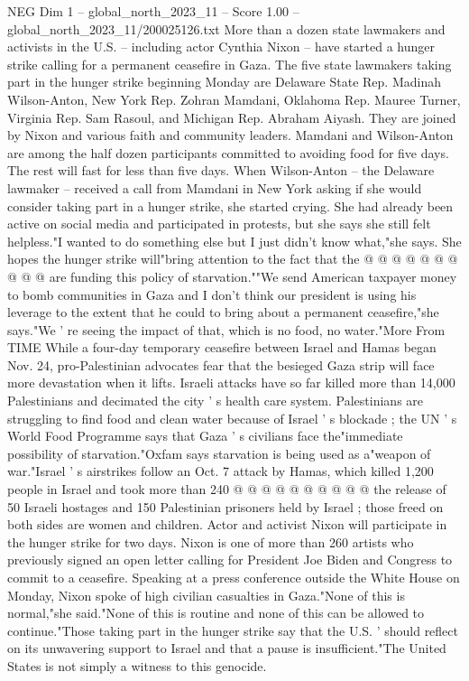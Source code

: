 \begin{textsample}{NEG Dim 1 – global\_north\_2023\_11 – Score 1.00 – global\_north\_2023\_11/200025126.txt}  \label{ex:f1_neg_103}
More than a dozen state lawmakers and activists in the U.S. -- including actor Cynthia Nixon -- have started a hunger strike calling for a permanent ceasefire in Gaza.
The five state lawmakers taking part in the hunger strike beginning Monday are Delaware State Rep.
Madinah Wilson-Anton, New York Rep.
Zohran Mamdani, Oklahoma Rep.
Mauree Turner, Virginia Rep.
Sam Rasoul, and Michigan Rep.
Abraham Aiyash.
They are joined by Nixon and various faith and community leaders.
Mamdani and Wilson-Anton are among the half dozen participants committed to avoiding food for five days.
The rest will fast for less than five days.
When Wilson-Anton -- the Delaware lawmaker -- received a call from Mamdani in New York asking if she would consider taking part in a hunger strike, she started crying.
She had already been active on social media and participated in protests, but she says she still felt helpless."I wanted to do something else but I just didn't know what,"she says.
She hopes the hunger strike will"bring attention to the fact that the @ @ @ @ @ @ @ @ @ @ are funding this policy of starvation.""We send American taxpayer money to bomb communities in Gaza and I don't think our president is using his leverage to the extent that he could to bring about a permanent ceasefire,"she says."We ' re seeing the impact of that, which is no food, no water."More From TIME While a four-day temporary ceasefire between Israel and Hamas began Nov. 24, pro-Palestinian advocates fear that the besieged Gaza strip will face more devastation when it lifts.
Israeli attacks have so far killed more than 14,000 Palestinians and decimated the city ' s health care system.
Palestinians are struggling to find food and clean water because of Israel ' s blockade ; the UN ' s World Food Programme says that Gaza ' s civilians face the"immediate possibility of starvation."Oxfam says starvation is being used as a"weapon of war."Israel ' s airstrikes follow an Oct. 7 attack by Hamas, which killed 1,200 people in Israel and took more than 240 @ @ @ @ @ @ @ @ @ @ the release of 50 Israeli hostages and 150 Palestinian prisoners held by Israel ; those freed on both sides are women and children.
Actor and activist Nixon will participate in the hunger strike for two days.
Nixon is one of more than 260 artists who previously signed an open letter calling for President Joe Biden and Congress to commit to a ceasefire.
Speaking at a press conference outside the White House on Monday, Nixon spoke of high civilian casualties in Gaza."None of this is normal,"she said."None of this is routine and none of this can be allowed to continue."Those taking part in the hunger strike say that the U.S. ' should reflect on its unwavering support to Israel and that a pause is insufficient."The United States is not simply a witness to this genocide.

\end{textsample}
